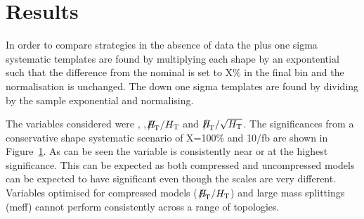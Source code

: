 \section{Results}

In order to compare strategies in the absence of data the plus one sigma systematic
templates are found by multiplying each shape by an expontential such that 
the difference from the nominal is set to X\% in the final bin 
and the normalisation is unchanged. The down one sigma templates are found by 
dividing by the sample exponential and normalising.

The variables considered were \alphat, \mht,$\mht/\scalht$ and $\mht/\sqrt{\scalht}$.
The significances from a conservative shape systematic scenario of X=100\% and 10/fb are shown
in Figure~\ref{}. As can be seen the \mht variable is consistently near or at the highest 
significance. This can be expected as both compressed and uncompressed models can be expected 
to have significant \mht even though the \scalht scales are very different. Variables optimised
for compressed models ($\mht/\scalht$) and large mass splittings (meff) cannot perform consistently
across a range of topologies.




